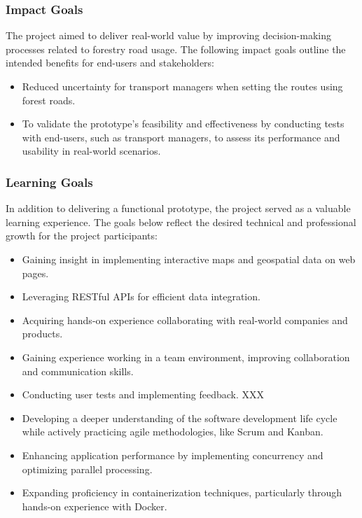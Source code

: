 \subsubsection{Impact Goals}

The project aimed to deliver real-world value by improving decision-making processes related to forestry road usage. The following impact goals outline the intended benefits for end-users and stakeholders:

\begin{itemize}
    \item Reduced uncertainty for transport managers when setting the routes using forest roads.
    \item To validate the prototype's feasibility and effectiveness by conducting tests with end-users, such as transport managers, to assess its performance and usability in real-world scenarios.
\end{itemize}

\subsubsection{Learning Goals}

In addition to delivering a functional prototype, the project served as a valuable learning experience. The goals below reflect the desired technical and professional growth for the project participants:

\begin{itemize}
    \item Gaining insight in implementing interactive maps and geospatial data on web pages.
    \item Leveraging RESTful APIs for efficient data integration.
    \item Acquiring hands-on experience collaborating with real-world companies and products.
    \item Gaining experience working in a team environment, improving collaboration and communication skills.
    \item Conducting user tests and implementing feedback. XXX
    \item Developing a deeper understanding of the software development life cycle while actively practicing agile methodologies, like Scrum and Kanban.
    \item Enhancing application performance by implementing concurrency and optimizing parallel processing.
    \item Expanding proficiency in containerization techniques, particularly through hands-on experience with Docker.
\end{itemize}

